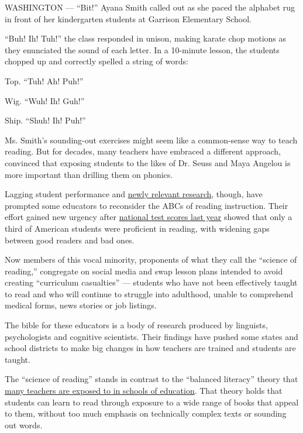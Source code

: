 WASHINGTON --- ``Bit!'' Ayana Smith called out as she paced the alphabet
rug in front of her kindergarten students at Garrison Elementary School.

``Buh! Ih! Tuh!'' the class responded in unison, making karate chop
motions as they enunciated the sound of each letter. In a 10-minute
lesson, the students chopped up and correctly spelled a string of words:

Top. ``Tuh! Ah! Puh!''

Wig. ``Wuh! Ih! Guh!''

Ship. ``Shuh! Ih! Puh!''

Ms. Smith's sounding-out exercises might seem like a common-sense way to
teach reading. But for decades, many teachers have embraced a different
approach, convinced that exposing students to the likes of Dr. Seuss and
Maya Angelou is more important than drilling them on phonics.

Lagging student performance and
\href{https://www.apmreports.org/emily-hanford}{newly relevant
research}, though, have prompted some educators to reconsider the ABCs
of reading instruction. Their effort gained new urgency after
\href{https://www.nytimes3xbfgragh.onion/2019/10/30/us/reading-scores-national-exam.html}{national
test scores last year} showed that only a third of American students
were proficient in reading, with widening gaps between good readers and
bad ones.

Now members of this vocal minority, proponents of what they call the
``science of reading,'' congregate on social media and swap lesson plans
intended to avoid creating ``curriculum casualties'' --- students who
have not been effectively taught to read and who will continue to
struggle into adulthood, unable to comprehend medical forms, news
stories or job listings.

The bible for these educators is a body of research produced by
linguists, psychologists and cognitive scientists. Their findings have
pushed some states and school districts to make big changes in how
teachers are trained and students are taught.

The ``science of reading'' stands in contrast to the ``balanced
literacy'' theory that
\href{https://www.edweek.org/ew/articles/2020/01/22/preservice-teachers-are-getting-mixed-messages-on.html}{many
teachers are exposed to in schools of education}. That theory holds that
students can learn to read through exposure to a wide range of books
that appeal to them, without too much emphasis on technically complex
texts or sounding out words.

